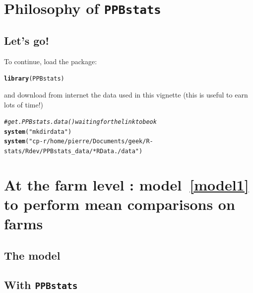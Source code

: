 \documentclass{article}\usepackage[]{graphicx}\usepackage[]{color}
\makeatletter
\newcommand{\hlstr}[1]{\textcolor[rgb]{0.192,0.494,0.8}{#1}}%
\newcommand{\hlcom}[1]{\textcolor[rgb]{0.678,0.584,0.686}{\textit{#1}}}%
\newcommand{\hlstd}[1]{\textcolor[rgb]{0.345,0.345,0.345}{#1}}%
\newcommand{\hlkwd}[1]{\textcolor[rgb]{0.737,0.353,0.396}{\textbf{#1}}}%
\newenvironment{kframe}{%
 \def\at@end@of@kframe{}%
 \ifinner\ifhmode%
  \def\at@end@of@kframe{\end{minipage}}%
  \begin{minipage}{\columnwidth}%
 \fi\fi%
 \def\FrameCommand##1{\hskip\@totalleftmargin \hskip-\fboxsep
 \colorbox{shadecolor}{##1}\hskip-\fboxsep
     \hskip-\linewidth \hskip-\@totalleftmargin \hskip\columnwidth}%
 \MakeFramed {\advance\hsize-\width
   \@totalleftmargin\z@ \linewidth\hsize
   \@setminipage}}%
 {\par\unskip\endMakeFramed%
 \at@end@of@kframe}
\newenvironment{knitrout}{}{} %
\newcommand{\pack}{\texttt{PPBstats}}
\makeatother
\begin{document}


\section{Philosophy of \pack}



\subsection{Let's go!}
To continue, load the package:
\begin{knitrout}
\color{fgcolor}\begin{kframe}
\begin{alltt}
\hlkwd{library}\hlstd{(PPBstats)}
\end{alltt}
\end{kframe}
\end{knitrout}
and download from internet the data used in this vignette (this is useful to earn lots of time!)
\begin{knitrout}
\color{fgcolor}\begin{kframe}
\begin{alltt}
\hlcom{# get.PPBstats.data() waiting for the link to be ok}
\hlkwd{system}\hlstd{(}\hlstr{"mkdir data"}\hlstd{)}
\hlkwd{system}\hlstd{(}\hlstr{"cp -r /home/pierre/Documents/geek/R-stats/Rdev/PPBstats_data/*RData ./data"}\hlstd{)}
\end{alltt}
\end{kframe}
\end{knitrout}


\section{At the farm level : model~\ref{model1} to perform mean comparisons on farms }
\label{section_model1}

\subsection{The model}


\subsection{With \pack}
\end{document}
